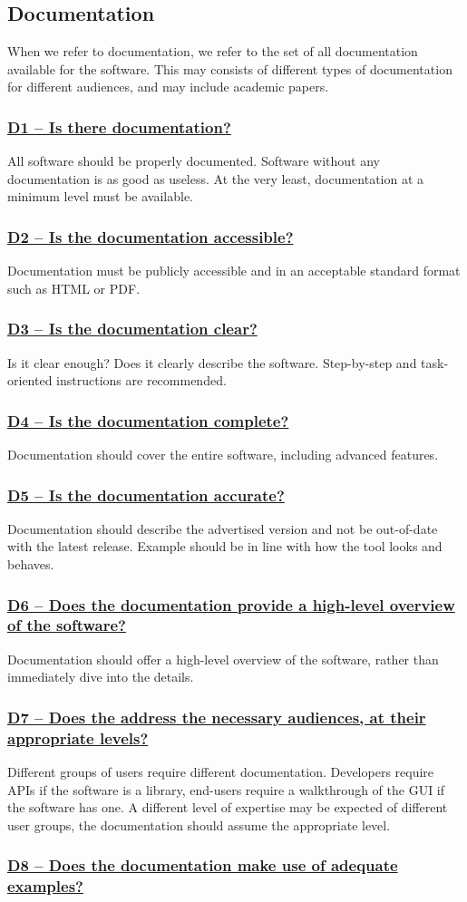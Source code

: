 \documentclass[a4paper,11pt]{article}
\newcommand{\criterion}[1]{\subsubsection*{\underline{#1}}}
\begin{document}
\subsection{Documentation}

When we refer to documentation, we refer to the set of all documentation
available for the software. This may consists of different types of
documentation for different audiences, and may include academic papers.

\criterion{D1 -- Is there documentation?}

All software should be properly documented. Software without any documentation
is as good as useless. At the very least, documentation at a minimum level
must be available. 

\criterion{D2 -- Is the documentation accessible?}

Documentation must be publicly accessible and in an acceptable standard format
such as HTML or PDF.

\criterion{D3 -- Is the documentation clear?}

Is it clear enough? Does it clearly describe the software. Step-by-step
and task-oriented instructions are recommended.

\criterion{D4 -- Is the documentation complete?}

Documentation should cover the entire software, including advanced features.

\criterion{D5 -- Is the documentation accurate?}

Documentation should describe the advertised version and not be out-of-date
with the latest release. Example should be in line with how the tool looks and
behaves.

\criterion{D6 -- Does the documentation provide a high-level overview of the software?}

Documentation should offer a high-level overview of the software, rather
than immediately dive into the details.

\criterion{D7 -- Does the address the necessary audiences, at their appropriate levels?}

Different groups of users require different documentation. Developers require
APIs if the software is a library, end-users require a walkthrough of the GUI
if the software has one. A different level of expertise may be expected of
different user groups, the documentation should assume the appropriate level.

\criterion{D8 -- Does the documentation make use of adequate examples?}
\end{document}
